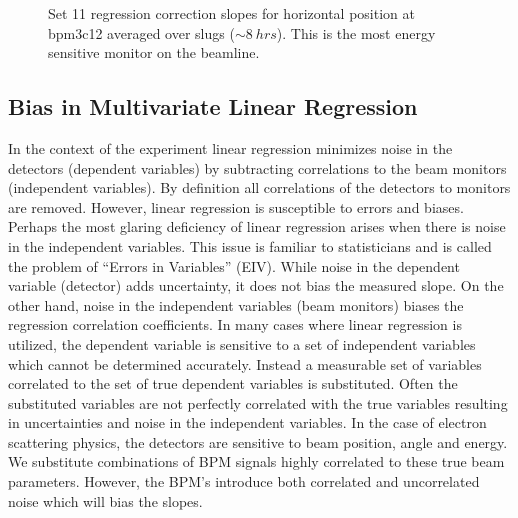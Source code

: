 \begin{figure}[h]
\centering
{}
\caption{Set 11 regression correction slopes for horizontal position at bpm3c12 averaged over slugs ($\sim 8~hrs$). This is the most energy sensitive monitor on the beamline.}
\label{fig:Set11_E_slopes}
\end{figure}
\FloatBarrier
\subsection{Bias in Multivariate Linear Regression}
In the context of the \Qs experiment linear regression minimizes noise in the detectors (dependent variables) by subtracting correlations to the beam monitors (independent variables). By definition all correlations of the detectors to monitors are removed. However, linear regression is susceptible to errors and biases. Perhaps the most glaring deficiency of linear regression arises when there is noise in the independent variables. This issue is familiar to statisticians and is called the problem of ``Errors in Variables'' (EIV). While noise in the dependent variable (detector) adds uncertainty, it does not bias the measured slope. On the other hand, noise in the independent variables (beam monitors) biases the regression correlation coefficients. In many cases where linear regression is utilized, the dependent variable is sensitive to a set of independent variables which cannot be determined accurately. Instead a measurable set of variables correlated to the set of true dependent variables is substituted. Often the substituted variables are not perfectly correlated with the true variables resulting in uncertainties and noise in the independent variables. In the case of electron scattering physics, the detectors are sensitive to beam position, angle and energy. We substitute combinations of BPM signals highly correlated to these true beam parameters. However, the BPM's introduce both correlated and uncorrelated noise which will bias the slopes.

